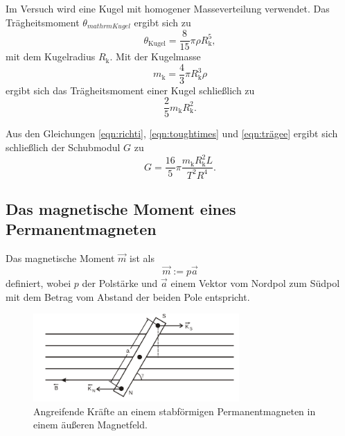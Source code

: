 Im Versuch wird eine Kugel mit homogener Masseverteilung verwendet.
Das Trägheitsmoment $\theta_{mathrm{Kugel}}$ ergibt sich zu
\begin{equation*}
	\theta_{\mathrm{Kugel}} = \frac{8}{15} \pi \rho R_{\mathrm{k}}^5 \mathrm{,}
\end{equation*}
mit dem Kugelradius $R_{\mathrm{k}}$.
Mit der Kugelmasse
\begin{equation*}
	m_{\mathrm{k}} = \frac{4}{3} \pi R_{\mathrm{k}}^3 \rho
\end{equation*}
ergibt sich das Trägheitsmoment einer Kugel schließlich zu
\begin{equation}
	\label{eqn:trägee}
	\frac{2}{5} m_{\mathrm{k}} R_{\mathrm{k}}^2 \mathrm{.}
\end{equation}

Aus den Gleichungen \eqref{eqn:richti}, \eqref{eqn:toughtimes} und \eqref{eqn:trägee} ergibt
sich schließlich der Schubmodul $G$ zu
\begin{equation}
	\label{eqn:schubischu}
	G = \frac{16}{5} \pi \frac{m_{\mathrm{k}} R_{\mathrm{k}}^2 L}{T^2 R^4} \mathrm{.}
\end{equation}


\FloatBarrier
\subsection{Das magnetische Moment eines Permanentmagneten}
\FloatBarrier
Das magnetische Moment $\vec{m}$ ist als
\begin{equation}
	\vec{m} := p \vec{a}
\end{equation}
definiert, wobei $p$ der Polstärke und $\vec{a}$ einem Vektor vom Nordpol zum Südpol mit dem
Betrag vom Abstand der beiden Pole entspricht.
\begin{figure}
	\centering
	\includegraphics[width=0.7\textwidth]{Bilder/Magnet.png}
	\caption{Angreifende Kräfte an einem stabförmigen Permanentmagneten in einem äußeren Magnetfeld. \cite{Anleitung}}
	\label{fig:magnetus}
\end{figure}

